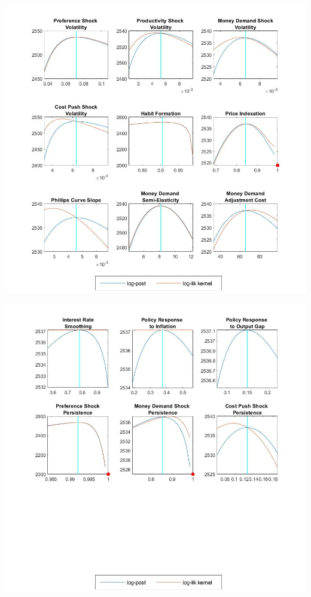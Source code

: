 \documentclass[11pt,preprint, authoryear]{elsarticle}
\let\origfigure\figure
\let\endorigfigure\endfigure
\renewenvironment{figure}[1][2] {
    \expandafter\origfigure\expandafter[H]
} {
    \endorigfigure
}
\numberwithin{equation}{section}
\numberwithin{figure}{section}
\numberwithin{table}{section}
\begin{document}
\begin{figure}
    \centering 
    \begin{minipage}[t]{8.2cm} 
        \centering 
        \includegraphics[width=\linewidth]{flex.jpg} 
    \end{minipage} 
    \hspace{0.1cm} 
    \begin{minipage}[t]{8.2cm} 
        \centering 
        \includegraphics[width=\linewidth]{flex1.jpg} 
    \end{minipage}
    \caption{Mode Check Plots - Flexible Money Growth Rule}
    \label{mode_flex}
\end{figure}
\end{document}
